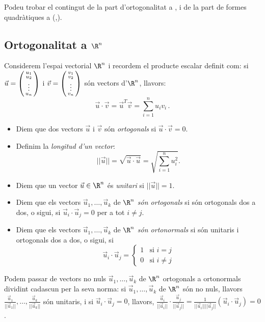 

Podeu trobar el contingut de la part d'ortogonalitat a \cite[Tema 5]{Bret}, i de la part de formes quadràtiques a (\cite[Tema~8]{Bret},\cite[Tema~4]{NaXa}).
\subsection{Ortogonalitat a \texorpdfstring{$\R^n$}{Rn}}
Considerem l'espai vectorial $\R^n$ i recordem el producte escalar definit com: si $\vec u=\left(\begin{smallmatrix}u_1\\u_2\\ \vdots\\u_n\end{smallmatrix}\right)$ i $\vec v=\left(\begin{smallmatrix}v_1\\v_2\\ \vdots \\ v_n\end{smallmatrix}\right)$ són vectors d'$\R^n$, llavors:
$$
\vec u \cdot \vec v = \vec u^T \vec v=\sum_{i=1}^n u_iv_i \,.
$$
\begin{definicio}
\begin{itemize}
    \item Diem que dos vectors $\vec u$ i $\vec v$ són \emph{ortogonals} si $\vec u\cdot\vec v=0$.
    \item Definim la \emph{longitud d'un vector}:
    $$
    ||\vec u||=\sqrt{\vec u\cdot \vec u}=\sqrt{\sum_{i=1}^n u_i^2}.
    $$
    \item Diem que un vector $\vec u\in\R^n$ és \emph{unitari} si $||\vec u||=1$.
    \item Diem que els vectors $\vec u_1, \dots, \vec u_k$ de $\R^n$ \emph{són ortogonals} si són ortogonals dos a dos, o sigui, si $\vec u_i\cdot\vec u_j=0$ per a tot $i\neq j$.
    \item Diem que els vectors $\vec u_1, \dots, \vec u_k$ de $\R^n$ \emph{són ortonormals} si són unitaris i ortogonals dos a dos, o sigui, si 
    $$\vec u_i\cdot\vec u_j=\left\{ \begin{array}{ll} 1 & \text{si $i=j$} \\ 0 & \text{si $i\neq j$}\end{array}\right.$$
\end{itemize}
\end{definicio}
\begin{observacio}
Podem passar de vectors no nuls $\vec u_1, \dots, \vec u_k$ de $\R^n$ ortogonals a ortonormals dividint cadascun per la seva norma: si $\vec u_1, \dots, \vec u_k$ de $\R^n$ són no nuls, llavors $\frac{\vec u_1}{||\vec u_1||}, \dots, \frac{\vec u_k}{||\vec u_k||}$ són unitaris, i si $\vec u_i\cdot \vec u_j=0$, llavors, $\frac{\vec u_i}{||\vec u_i||}\cdot \frac{\vec u_j}{||\vec u_j||}=\frac{1}{||\vec u_i|| ||\vec u_j||}(\vec u_i\cdot \vec u_j)=0$.
\end{observacio}
